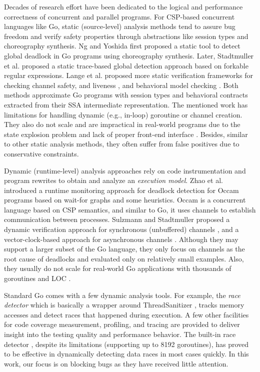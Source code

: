 Decades of research effort have been dedicated to the logical and performance correctness of concurrent and parallel programs.
%
For CSP-based concurrent languages like Go, static (source-level) analysis methods \cite{ng-dl-cc16,lange-fence-popl17,lange-staticType-icse18} tend to assure bug freedom and verify safety properties through abstractions like session types and choreography synthesis.
%
Ng and Yoshida \cite{ng-dl-cc16} first proposed a static tool to detect global deadlock in Go programs using choreography synthesis.
%
Later, Stadtmuller et al. \cite{stadtmuller-minigo-aplas16} proposed a static trace-based global detection approach based on forkable regular expressions.
%
Lange et al. proposed more static verification frameworks for checking channel safety, and liveness \cite{lange-fence-popl17}, and behavioral model checking \cite{lange-staticType-icse18}.
%
Both methods approximate Go programs with session types and behavioral contracts extracted from their SSA intermediate representation.
%
The mentioned work has limitations for handling dynamic (e.g., in-loop) goroutine or channel creation.
%
They also do not scale and are impractical in real-world programs due to the state explosion problem and lack of proper front-end interface \cite{yuan-gobench-cgo21}.
%
Besides, similar to other static analysis methods, they often suffer from false positives due to conservative constraints.

%
Dynamic (runtime-level) analysis approaches \cite{sulzmann-twophase-2018,dilley-gomela-corr2020} rely on code instrumentation and program rewrites to obtain and analyze an \textit{execution model}.
%
Zhao et al. \cite{zhao-occam97} introduced a runtime monitoring approach for deadlock detection for Occam programs based on wait-for graphs and some heuristics. Occam is a concurrent language based on CSP semantics, and similar to Go, it uses channels to establish communication between processes.
%
Sulzmann and Stadtmuller proposed a dynamic verification approach for synchronous (unbuffered) channels \cite{sulzmann-corr17}, and a vector-clock-based approach for asynchronous channels \cite{sulzmann-twophase-2018}.
%
Although they may support a larger subset of the Go language, they only focus on channels as the root cause of deadlocks and evaluated only on relatively small examples.
%
Also, they usually do not scale for real-world Go applications with thousands of goroutines and LOC \cite{dilley-empirical-saner19}.
%

Standard Go comes with a few dynamic analysis tools. For example, the \textit{race detector} \cite{go-race-blog} which is basically a wrapper around ThreadSanitizer \cite{konstantin-tsan-wbia09}, tracks memory accesses and detect races that happened during execution.
%
A few other facilities for code coverage measurement, profiling, and tracing \cite{go-package-trace} are provided to deliver insight into the testing quality and performance behavior.
%
The built-in race detector \cite{go-race-blog}, despite its limitations (\eg supporting up to 8192 goroutines), has proved to be effective in dynamically detecting data races in most cases quickly.
%
In this work, our focus is on blocking bugs as they have received little attention.

